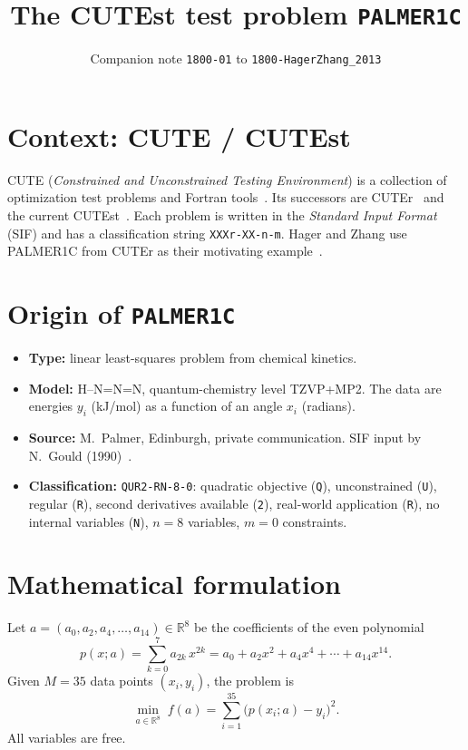 \documentclass[11pt]{article}
\title{The CUTEst test problem \texttt{PALMER1C}}
\author{Companion note \texttt{1800-01} to \texttt{1800-HagerZhang\_2013}}
\date{}
\newcommand{\R}{\mathbb{R}}
\begin{document}
\maketitle

\section{Context: CUTE / CUTEst}
CUTE (\emph{Constrained and Unconstrained Testing Environment}) is a collection of
optimization test problems and Fortran tools~\cite{BCGT95}.
Its successors are CUTEr~\cite{GOT03} and the current CUTEst~\cite{GOT15}.
Each problem is written in the \emph{Standard Input Format} (SIF) and has a
classification string \texttt{XXXr-XX-n-m}. Hager and Zhang use PALMER1C from
CUTEr as their motivating example~\cite[pp.~2150--2152]{HZ13}.

\section{Origin of \texttt{PALMER1C}}
\begin{itemize}
  \item \textbf{Type:} linear least-squares problem from chemical kinetics.
  \item \textbf{Model:} H--N=N=N, quantum-chemistry level TZVP+MP2. The data are
        energies $y_i$ (kJ/mol) as a function of an angle $x_i$ (radians).
  \item \textbf{Source:} M.~Palmer, Edinburgh, private communication.
        SIF input by N.~Gould (1990)~\cite{SIF}.
  \item \textbf{Classification:} \texttt{QUR2-RN-8-0}:
        quadratic objective (\texttt{Q}), unconstrained (\texttt{U}),
        regular (\texttt{R}), second derivatives available (\texttt{2}),
        real-world application (\texttt{R}), no internal variables (\texttt{N}),
        $n=8$ variables, $m=0$ constraints.
\end{itemize}

\section{Mathematical formulation}
Let $a=(a_0,a_2,a_4,\dots,a_{14})\in\R^8$ be the coefficients of the even
polynomial
\[
  p(x;a)=\sum_{k=0}^{7} a_{2k}\,x^{2k}
        = a_0+a_2x^2+a_4x^4+\cdots+a_{14}x^{14}.
\]
Given $M=35$ data points $(x_i,y_i)$, the problem is
\[
  \boxed{\;
  \min_{a\in\R^8}\; f(a)=\sum_{i=1}^{35}\bigl(p(x_i;a)-y_i\bigr)^2 .\;}
\]
All variables are free.
\end{document}
